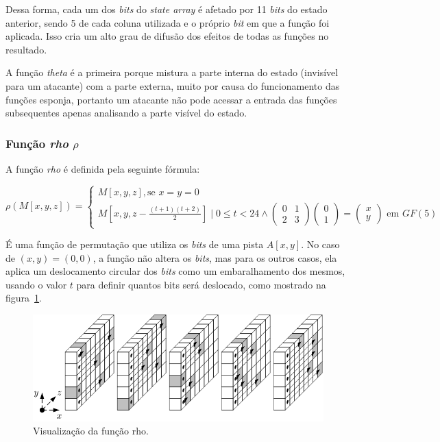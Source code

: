 Dessa forma, cada um dos \textit{bits} do \textit{state array} é afetado por
11 \textit{bits} do estado anterior, sendo 5 de cada coluna utilizada e o
próprio \textit{bit} em que a função foi aplicada. Isso cria um alto grau de
difusão dos efeitos de todas as funções no resultado.

A função \textit{theta} é a primeira porque mistura a parte interna do estado
(invisível para um atacante) com a parte externa, muito por causa do
funcionamento das funções esponja, portanto um atacante não pode acessar a
entrada das funções subsequentes apenas analisando a parte visível do estado.

\subsubsection{Função \textit{rho} $\rho$}

A função \textit{rho} é definida pela seguinte fórmula:

$\rho(M[x, y, z]) = \begin{cases}
    M[x, y, z], \mbox{se } x=y=0 \\
    M[x, y, z - \frac{(t+1)(t+2)}{2}] \mid 0 \leq t < 24 \land
    \begin{pmatrix}0 & 1 \\ 2 & 3\end{pmatrix}
    \begin{pmatrix}0 \\ 1\end{pmatrix} =
    \begin{pmatrix}x \\ y\end{pmatrix}
    \mbox{ em } GF(5)
\end{cases}$

É uma função de permutação que utiliza os \textit{bits} de uma pista $A[x, y]$.
No caso de $(x, y) = (0, 0)$, a função não altera os \textit{bits}, mas para
os outros casos, ela aplica um deslocamento circular dos \textit{bits} como um
embaralhamento dos mesmos, usando o valor $t$ para definir quantos bits será
deslocado, como mostrado na figura~\ref{fig:rho}.

\begin{figure}[ht]
    \centering
    \includegraphics{images/rho.png}
    \caption{Visualização da função rho.}
    \label{fig:rho}
\end{figure}

